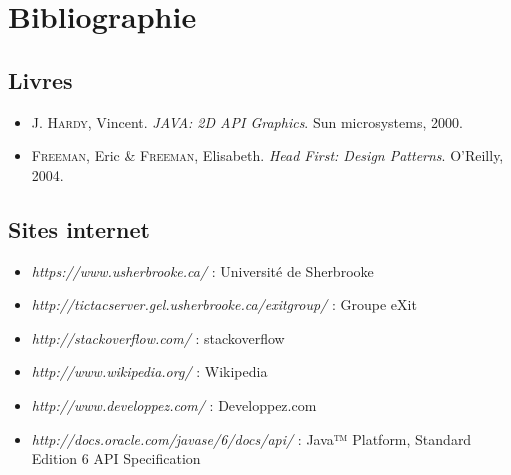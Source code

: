\section*{Bibliographie} %

\subsection*{Livres}

\begin{itemize}
    \item \textsc{J. Hardy}, Vincent. \emph{JAVA: 2D API Graphics}. Sun microsystems, 2000.
    \item \textsc{Freeman}, Eric \& \textsc{Freeman}, Elisabeth. \emph{Head First: Design Patterns}. O'Reilly, 2004.
\end{itemize}

\subsection*{Sites internet}

\begin{itemize}
    \item \emph{https://www.usherbrooke.ca/} : Université de Sherbrooke
    \item \emph{http://tictacserver.gel.usherbrooke.ca/exitgroup/} : Groupe eXit
    \item \emph{http://stackoverflow.com/} : stackoverflow
    \item \emph{http://www.wikipedia.org/} : Wikipedia
    \item \emph{http://www.developpez.com/} : Developpez.com
    \item \emph{http://docs.oracle.com/javase/6/docs/api/} : 
        Java™ Platform, Standard Edition 6
        API Specification
\end{itemize}
